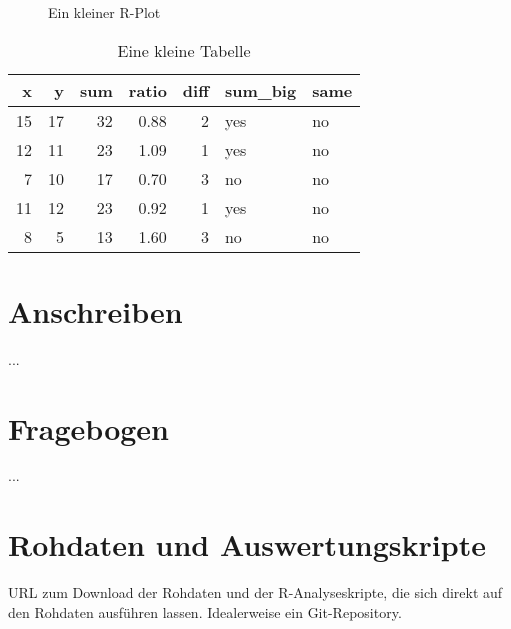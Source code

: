 \documentclass[de]{agse-empir-report}\usepackage[]{graphicx}\usepackage[]{color}
\makeatletter
\newenvironment{kframe}{%
 \def\at@end@of@kframe{}%
 \ifinner\ifhmode%
  \def\at@end@of@kframe{\end{minipage}}%
  \begin{minipage}{\columnwidth}%
 \fi\fi%
 \def\FrameCommand##1{\hskip\@totalleftmargin \hskip-\fboxsep
 \colorbox{shadecolor}{##1}\hskip-\fboxsep
     \hskip-\linewidth \hskip-\@totalleftmargin \hskip\columnwidth}%
 \MakeFramed {\advance\hsize-\width
   \@totalleftmargin\z@ \linewidth\hsize
   \@setminipage}}%
 {\par\unskip\endMakeFramed%
 \at@end@of@kframe}
\newenvironment{knitrout}{}{} %
\makeatother
\begin{document}
\begin{figure}
\begin{knitrout}
\color{fgcolor}\begin{kframe}


{\ttfamily\noindent\bfseries{}}

{\ttfamily\noindent\bfseries{}}

{\ttfamily\noindent\bfseries\color{errorcolor}{\#\# Error in print(plt): Objekt 'plt' nicht gefunden}}\end{kframe}
\end{knitrout}
    \caption{Ein kleiner R-Plot}
\end{figure}

\begin{table}
    \centering
\begin{knitrout}
\color{fgcolor}
\begin{tabular}{rrrrrll}
\toprule
x & y & sum & ratio & diff & sum\_big & same\\
\midrule
15 & 17 & 32 & 0.88 & 2 & yes & no\\
12 & 11 & 23 & 1.09 & 1 & yes & no\\
7 & 10 & 17 & 0.70 & 3 & no & no\\
11 & 12 & 23 & 0.92 & 1 & yes & no\\
8 & 5 & 13 & 1.60 & 3 & no & no\\
\bottomrule
\end{tabular}


\end{knitrout}
    \caption{Eine kleine Tabelle}
\end{table}

\nocite{*}




\appendix

\section{Anschreiben}

...


\section{Fragebogen}

...


\section{Rohdaten und Auswertungskripte}

URL zum Download der Rohdaten und der R-Analyseskripte, die sich direkt auf den
Rohdaten ausführen lassen.
Idealerweise ein Git-Repository.
\end{document}
